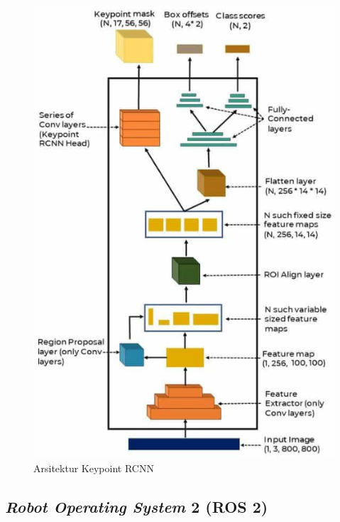 \begin{figure}[ht]
  \centering
  \includegraphics[scale=0.8]{gambar/keypoint-rcnn-arch.png}
  \caption{Arsitektur Keypoint RCNN}
  \label{fig:keypoint-rcnn-architecture}
\end{figure}


\subsection{\textit{Robot Operating System} 2 (ROS 2)}
\label{subsec:ros2}


